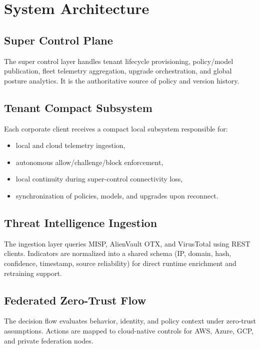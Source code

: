 \documentclass[conference]{IEEEtran}
\begin{document}
\section{System Architecture}
\subsection{Super Control Plane}
The super control layer handles tenant lifecycle provisioning, policy/model publication, fleet telemetry aggregation, upgrade orchestration, and global posture analytics. It is the authoritative source of policy and version history.

\subsection{Tenant Compact Subsystem}
Each corporate client receives a compact local subsystem responsible for:
\begin{itemize}
  \item local and cloud telemetry ingestion,
  \item autonomous allow/challenge/block enforcement,
  \item local continuity during super-control connectivity loss,
  \item synchronization of policies, models, and upgrades upon reconnect.
\end{itemize}

\subsection{Threat Intelligence Ingestion}
The ingestion layer queries MISP, AlienVault OTX, and VirusTotal using REST clients. Indicators are normalized into a shared schema (IP, domain, hash, confidence, timestamp, source reliability) for direct runtime enrichment and retraining support.

\subsection{Federated Zero-Trust Flow}
The decision flow evaluates behavior, identity, and policy context under zero-trust assumptions. Actions are mapped to cloud-native controls for AWS, Azure, GCP, and private federation nodes.
\end{document}
